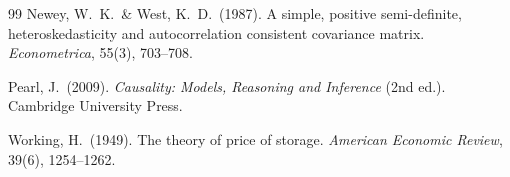 \documentclass[12pt,a4paper]{article}
\begin{document}
\begin{thebibliography}{99}
Newey, W.\ K.\ \& West, K.\ D.\ (1987).
\newblock A simple, positive semi-definite, heteroskedasticity and autocorrelation consistent covariance matrix.
\newblock \emph{Econometrica}, 55(3), 703--708.

Pearl, J.\ (2009).
\newblock \emph{Causality: Models, Reasoning and Inference} (2nd ed.).
\newblock Cambridge University Press.

Working, H.\ (1949).
\newblock The theory of price of storage.
\newblock \emph{American Economic Review}, 39(6), 1254--1262.

\end{thebibliography}
\end{document}
